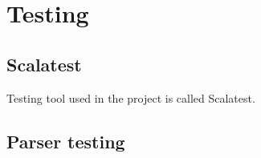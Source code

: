 \section{Testing}
\subsection{Scalatest}
Testing tool used in the project is called Scalatest. 

\subsection{Parser testing}

